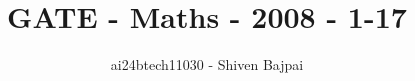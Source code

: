 \documentclass[journal]{IEEEtran}
\begin{document}
\onecolumn

\vspace{3cm}

\renewcommand{\thefigure}{\theenumi}
\renewcommand{\thetable}{\theenumi}

\title{GATE - Maths - 2008 - 1-17}
\author{ai24btech11030 - Shiven Bajpai}
\maketitle

\iffalse
\begin{multicols}{4}
\begin{enumerate}
    \item 
    \item 
    \item 
    \item 
\end{enumerate}
\end{multicols}
\fi
\end{document}
